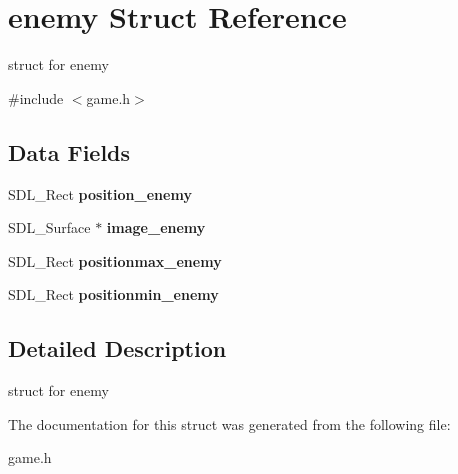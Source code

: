 \hypertarget{structenemy}{}\section{enemy Struct Reference}
\label{structenemy}


struct for enemy  




{\ttfamily \#include $<$game.\+h$>$}

\subsection*{Data Fields}
\begin{DoxyCompactItemize}
\item 
\mbox{\label{structenemy_a70662a0b9becc1763ef18f022b668696}} 
S\+D\+L\+\_\+\+Rect {\bfseries position\+\_\+enemy}
\item 
\mbox{\label{structenemy_a39fbc07cd1f9630e235fdd1b0912aeaa}} 
S\+D\+L\+\_\+\+Surface $\ast$ {\bfseries image\+\_\+enemy}
\item 
\mbox{\label{structenemy_a7ff9acc06416fed9ec72402d4e386125}} 
S\+D\+L\+\_\+\+Rect {\bfseries positionmax\+\_\+enemy}
\item 
\mbox{\label{structenemy_a8e1615c722907584040d0f491f219b92}} 
S\+D\+L\+\_\+\+Rect {\bfseries positionmin\+\_\+enemy}
\end{DoxyCompactItemize}


\subsection{Detailed Description}
struct for enemy 

The documentation for this struct was generated from the following file\+:\begin{DoxyCompactItemize}
\item 
game.\+h\end{DoxyCompactItemize}
